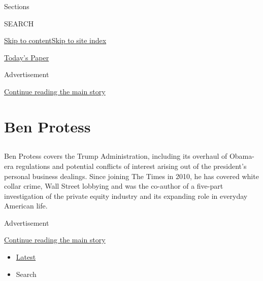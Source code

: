 Sections

SEARCH

\protect\hyperlink{site-content}{Skip to
content}\protect\hyperlink{site-index}{Skip to site index}

\href{https://myaccount.nytimes3xbfgragh.onion/auth/login?response_type=cookie\&client_id=vi}{}

\href{https://www.nytimes3xbfgragh.onion/section/todayspaper}{Today's
Paper}

Advertisement

\protect\hyperlink{after-top}{Continue reading the main story}

\hypertarget{ben-protess}{%
\section{Ben Protess}\label{ben-protess}}

\subsection{}

Ben Protess covers the Trump Administration, including its overhaul of
Obama-era regulations and potential conflicts of interest arising out of
the president's personal business dealings. Since joining The Times in
2010, he has covered white collar crime, Wall Street lobbying and was
the co-author of a five-part investigation of the private equity
industry and its expanding role in everyday American life.

Advertisement

\protect\hyperlink{after-mid1}{Continue reading the main story}

\begin{itemize}
\tightlist
\item
  \protect\hyperlink{stream-panel}{Latest}
\item
  Search
\end{itemize}

